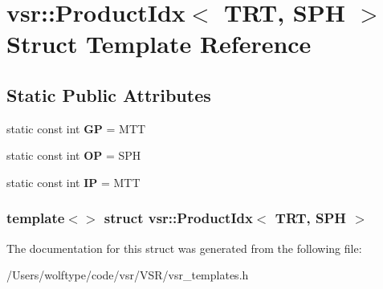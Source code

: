 \hypertarget{structvsr_1_1_product_idx_3_01_t_r_t_00_01_s_p_h_01_4}{\section{vsr\-:\-:Product\-Idx$<$ T\-R\-T, S\-P\-H $>$ Struct Template Reference}
\label{structvsr_1_1_product_idx_3_01_t_r_t_00_01_s_p_h_01_4}
}
\subsection*{Static Public Attributes}
\begin{DoxyCompactItemize}
\item 
\hypertarget{structvsr_1_1_product_idx_3_01_t_r_t_00_01_s_p_h_01_4_ab3f9e25d9a692bf96eaa681d277c8cdc}{static const int {\bfseries G\-P} = M\-T\-T}\label{structvsr_1_1_product_idx_3_01_t_r_t_00_01_s_p_h_01_4_ab3f9e25d9a692bf96eaa681d277c8cdc}

\item 
\hypertarget{structvsr_1_1_product_idx_3_01_t_r_t_00_01_s_p_h_01_4_a795ee17f3857b26747e489ec37e57714}{static const int {\bfseries O\-P} = S\-P\-H}\label{structvsr_1_1_product_idx_3_01_t_r_t_00_01_s_p_h_01_4_a795ee17f3857b26747e489ec37e57714}

\item 
\hypertarget{structvsr_1_1_product_idx_3_01_t_r_t_00_01_s_p_h_01_4_a7474e084dffe56cb2dd80cac27a23d08}{static const int {\bfseries I\-P} = M\-T\-T}\label{structvsr_1_1_product_idx_3_01_t_r_t_00_01_s_p_h_01_4_a7474e084dffe56cb2dd80cac27a23d08}

\end{DoxyCompactItemize}
\subsubsection*{template$<$$>$ struct vsr\-::\-Product\-Idx$<$ T\-R\-T, S\-P\-H $>$}



The documentation for this struct was generated from the following file\-:\begin{DoxyCompactItemize}
\item 
/\-Users/wolftype/code/vsr/\-V\-S\-R/vsr\-\_\-templates.\-h\end{DoxyCompactItemize}
